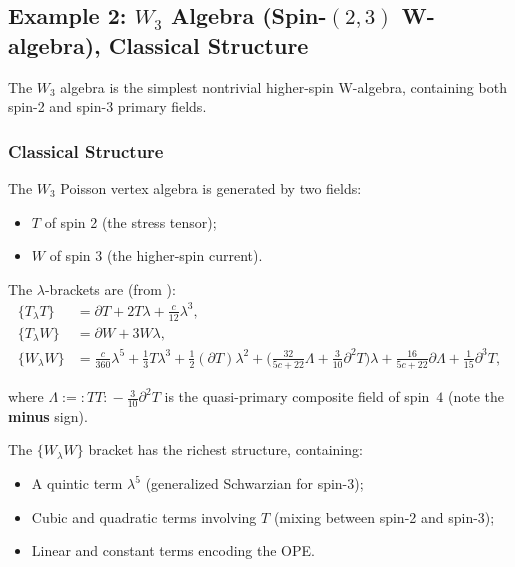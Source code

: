 \subsection{Example 2: $W_3$ Algebra (Spin-$(2,3)$ W-algebra), Classical Structure}

The $W_3$ algebra is the simplest nontrivial higher-spin W-algebra, containing both spin-2 and spin-3 primary fields.

\subsubsection{Classical Structure}

The $W_3$ Poisson vertex algebra is generated by two fields:
\begin{itemize}
\item $T$ of spin 2 (the stress tensor);
\item $W$ of spin 3 (the higher-spin current).
\end{itemize}

The $\lambda$-brackets are (from \cite{KZ25}):
\begin{align}
\{T_\lambda T\} &= \partial T + 2T\lambda + \frac{c}{12}\lambda^3,\\
\{T_\lambda W\} &= \partial W + 3W\lambda,\\
\{W_\lambda W\} &= \frac{c}{360}\lambda^5 + \frac{1}{3}T\lambda^3 + \frac{1}{2}(\partial T)\lambda^2 + \biggl(\frac{32}{5c + 22}\Lambda + \frac{3}{10}\partial^2 T\biggr)\lambda + \frac{16}{5c + 22}\partial\Lambda + \frac{1}{15}\partial^3 T,
\end{align}

\noindent
where $\Lambda := {:\!TT\!:} - \tfrac{3}{10}\partial^2 T$ is the quasi-primary composite field of spin~$4$ (note the \textbf{minus} sign).

\begin{remark}[Structure of $W_3$]
The $\{W_\lambda W\}$ bracket has the richest structure, containing:
\begin{itemize}
\item A quintic term $\lambda^5$ (generalized Schwarzian for spin-3);
\item Cubic and quadratic terms involving $T$ (mixing between spin-2 and spin-3);
\item Linear and constant terms encoding the OPE.
\end{itemize}
\end{remark}

